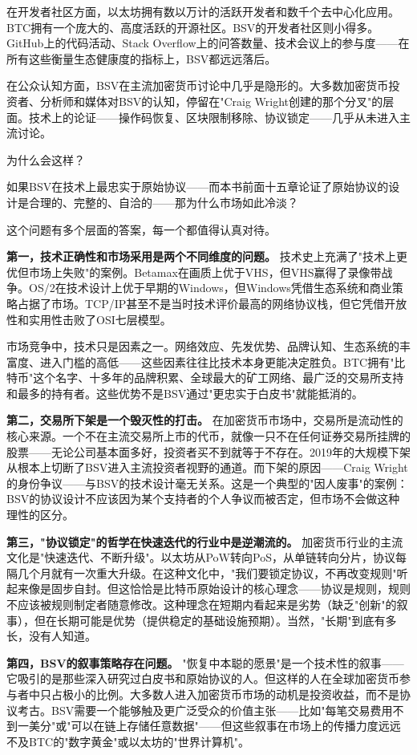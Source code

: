 \documentclass[a4paper,12pt,openany]{ctexbook}
\begin{document}
在开发者社区方面，以太坊拥有数以万计的活跃开发者和数千个去中心化应用。BTC拥有一个庞大的、高度活跃的开源社区。BSV的开发者社区则小得多。GitHub上的代码活动、Stack Overflow上的问答数量、技术会议上的参与度——在所有这些衡量生态健康度的指标上，BSV都远远落后。

在公众认知方面，BSV在主流加密货币讨论中几乎是隐形的。大多数加密货币投资者、分析师和媒体对BSV的认知，停留在"Craig Wright创建的那个分叉"的层面。技术上的论证——操作码恢复、区块限制移除、协议锁定——几乎从未进入主流讨论。

为什么会这样？

如果BSV在技术上最忠实于原始协议——而本书前面十五章论证了原始协议的设计是合理的、完整的、自洽的——那为什么市场如此冷淡？

这个问题有多个层面的答案，每一个都值得认真对待。

\textbf{第一，技术正确性和市场采用是两个不同维度的问题。} 技术史上充满了"技术上更优但市场上失败"的案例。Betamax在画质上优于VHS，但VHS赢得了录像带战争。OS/2在技术设计上优于早期的Windows，但Windows凭借生态系统和商业策略占据了市场。TCP/IP甚至不是当时技术评价最高的网络协议栈，但它凭借开放性和实用性击败了OSI七层模型。

市场竞争中，技术只是因素之一。网络效应、先发优势、品牌认知、生态系统的丰富度、进入门槛的高低——这些因素往往比技术本身更能决定胜负。BTC拥有"比特币"这个名字、十多年的品牌积累、全球最大的矿工网络、最广泛的交易所支持和最多的持有者。这些优势不是BSV通过"更忠实于白皮书"就能抵消的。

\textbf{第二，交易所下架是一个毁灭性的打击。} 在加密货币市场中，交易所是流动性的核心来源。一个不在主流交易所上市的代币，就像一只不在任何证券交易所挂牌的股票——无论公司基本面多好，投资者买不到就等于不存在。2019年的大规模下架从根本上切断了BSV进入主流投资者视野的通道。而下架的原因——Craig Wright的身份争议——与BSV的技术设计毫无关系。这是一个典型的"因人废事"的案例：BSV的协议设计不应该因为某个支持者的个人争议而被否定，但市场不会做这种理性的区分。

\textbf{第三，"协议锁定"的哲学在快速迭代的行业中是逆潮流的。} 加密货币行业的主流文化是"快速迭代、不断升级"。以太坊从PoW转向PoS，从单链转向分片，协议每隔几个月就有一次重大升级。在这种文化中，"我们要锁定协议，不再改变规则"听起来像是固步自封。但这恰恰是比特币原始设计的核心理念——协议是规则，规则不应该被规则制定者随意修改。这种理念在短期内看起来是劣势（缺乏"创新"的叙事），但在长期可能是优势（提供稳定的基础设施预期）。当然，"长期"到底有多长，没有人知道。

\textbf{第四，BSV的叙事策略存在问题。} "恢复中本聪的愿景"是一个技术性的叙事——它吸引的是那些深入研究过白皮书和原始协议的人。但这样的人在全球加密货币参与者中只占极小的比例。大多数人进入加密货币市场的动机是投资收益，而不是协议考古。BSV需要一个能够触及更广泛受众的价值主张——比如"每笔交易费用不到一美分"或"可以在链上存储任意数据"——但这些叙事在市场上的传播力度远远不及BTC的"数字黄金"或以太坊的"世界计算机"。
\end{document}
